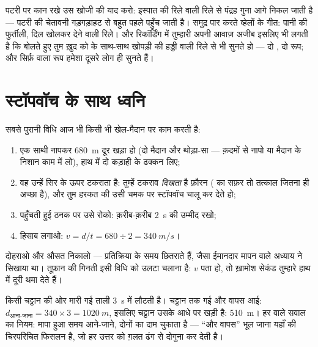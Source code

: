 \begin{example}[पुराने दृश्य, नए अंक]\label{ex:g7:sound-production:scenes}
पटरी पर कान रखे उस खोजी की याद करो: इस्पात की रिले  वाली रिले से
पंद्रह गुना आगे निकल जाती है --- पटरी की चेतावनी गड़गड़ाहट से बहुत
पहले पहुँच जाती है। समुद्र पार करते व्हेलों के गीत: पानी की फुर्तीली,
दिल खोलकर देने वाली रिले। और रिकॉर्डिंग में तुम्हारी अपनी आवाज़ अजीब
इसलिए भी लगती है कि बोलते हुए तुम ख़ुद को  के साथ-साथ खोपड़ी की
हड्डी वाली रिले से भी सुनते हो --- दो , दो रूप; और सिर्फ़ 
वाला रूप हमेशा दूसरे लोग ही सुनते हैं।
\end{example}

\section{स्टॉपवॉच के साथ ध्वनि}

\begin{method}[ध्वनि की चाल मापना]\label{met:g7:sound-production:measure}
सबसे पुरानी विधि आज भी किसी भी खेल-मैदान पर काम करती है:
\begin{enumerate}
  \item एक साथी नापकर \qty{680}{m} दूर खड़ा हो (दो मैदान और थोड़ा-सा
        --- क़दमों से नापो या मैदान के निशान काम में लो), हाथ में दो
        कड़ाही के ढक्कन लिए;
  \item वह उन्हें सिर के ऊपर टकराता है: तुम्हें टकराव \emph{दिखता} है
        फ़ौरन ( का सफ़र तो तत्काल जितना ही अच्छा है), और तुम
        हरकत की उसी चमक पर स्टॉपवॉच चालू कर देते हो;
  \item पहुँचती हुई ठनक पर उसे रोको: क़रीब-क़रीब \qty{2}{s} की उम्मीद
        रखो;
  \item हिसाब लगाओ: $v = d/t = 680 \div 2 = \qty{340}{m/s}$।
\end{enumerate}
दोहराओ और औसत निकालो --- प्रतिक्रिया के समय छितराते हैं, जैसा ईमानदार
मापन वाले अध्याय ने सिखाया था। तूफ़ान की गिनती इसी विधि को उलटा चलाना
है: $v$ पता हो, तो ख़ामोश सेकंड तुम्हारे हाथ में दूरी थमा देते हैं।
\end{method}

\begin{example}[प्रतिध्वनि, हिसाब लगाकर]\label{ex:g7:sound-production:echo}
किसी चट्टान की ओर मारी गई ताली \qty{3}{s} में लौटती है।  चट्टान
तक गई और वापस आई: $d_{\text{आना-जाना}} = 340 \times 3 =
\qty{1020}{m}$, इसलिए चट्टान उसके आधे पर खड़ी है: \qty{510}{m}। हर
 वाले सवाल का नियम: मापा हुआ समय आने-जाने, दोनों का दाम
चुकाता है --- ``और वापस'' भूल जाना यहाँ की चिरपरिचित फिसलन है, जो हर
उत्तर को ग़लत ढंग से दोगुना कर देती है।
\end{example}

